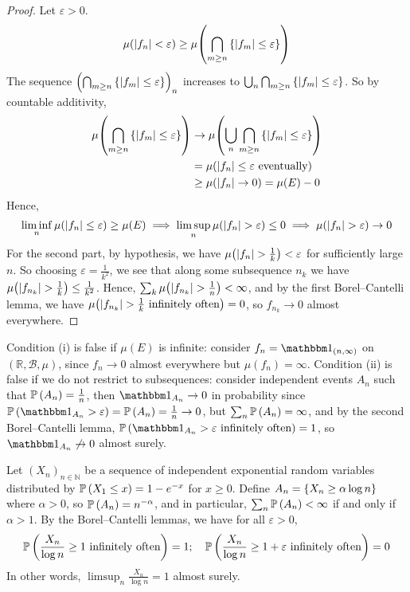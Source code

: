 \begin{proof}
	Let \( \varepsilon > 0 \).
	\[ \mu(\abs{f_n} < \varepsilon) \geq \mu\qty(\bigcap_{m \geq n} \qty{\abs{f_m} \leq \varepsilon}) \]
	The sequence \( \qty(\bigcap_{m \geq n} \qty{\abs{f_m} \leq \varepsilon})_n \) increases to \( \bigcup_n \bigcap_{m \geq n} \qty{\abs{f_m} \leq \varepsilon} \).
	So by countable additivity,
	\begin{align*}
		\mu\qty(\bigcap_{m \geq n} \qty{\abs{f_m} \leq \varepsilon}) &\to \mu\qty(\bigcup_n \bigcap_{m \geq n} \qty{\abs{f_m} \leq \varepsilon}) \\
		&= \mu\qty(\abs{f_n} \leq \varepsilon \text{ eventually}) \\
		&\geq \mu(\abs{f_n} \to 0) = \mu(E) - 0
	\end{align*}
	Hence,
	\[ \liminf_n \mu(\abs{f_n} \leq \varepsilon) \geq \mu(E) \implies \limsup_n \mu(\abs{f_n} > \varepsilon) \leq 0 \implies \mu(\abs{f_n} > \varepsilon) \to 0 \]
	For the second part, by hypothesis, we have \( \mu\qty(\abs{f_n} > \frac{1}{k}) < \varepsilon \) for sufficiently large \( n \).
	So choosing \( \varepsilon = \frac{1}{k^2} \), we see that along some subsequence \( n_k \) we have \( \mu\qty(\abs{f_{n_k}} > \frac{1}{k}) \leq \frac{1}{k^2} \).
	Hence, \( \sum_k \mu\qty(\abs{f_{n_k}} > \frac{1}{n}) < \infty \), and by the first Borel--Cantelli lemma, we have \( \mu\qty(\abs{f_{n_k}} > \frac{1}{k} \text{ infinitely often}) = 0 \), so \( f_{n_k} \to 0 \) almost everywhere.
\end{proof}
\begin{remark}
	Condition (i) is false if \( \mu(E) \) is infinite: consider \( f_n = \mathbbm 1_{(n,\infty)} \) on \( (\mathbb R,\mathcal B,\mu) \), since \( f_n \to 0 \) almost everywhere but \( \mu(f_n) = \infty \).
	Condition (ii) is false if we do not restrict to subsequences: consider independent events \( A_n \) such that \( \mathbb{P}\left({A_n}\right) = \frac{1}{n} \), then \( \mathbbm 1_{A_n} \to 0 \) in probability since \( \prob{\mathbbm 1_{A_n} > \varepsilon} = \prob{A_n} = \frac{1}{n} \to 0 \), but \( \sum_n \mathbb{P}\left({A_n}\right) = \infty \), and by the second Borel--Cantelli lemma, \( \prob{\mathbbm 1_{A_n} > \varepsilon \text{ infinitely often}} = 1 \), so \( \mathbbm 1_{A_n} \not\to 0 \) almost surely.
\end{remark}
\begin{example}
	Let \( (X_n)_{n \in \mathbb N} \) be a sequence of independent exponential random variables distributed by \( \mathbb{P}\left({X_1 \leq x}\right) = 1 - e^{-x} \) for \( x \geq 0 \).
	Define \( A_n = \qty{X_n \geq \alpha \log n} \) where \( \alpha > 0 \), so \( \mathbb{P}\left({A_n}\right) = n^{-\alpha} \), and in particular, \( \sum_n \mathbb{P}\left({A_n}\right) < \infty \) if and only if \( \alpha > 1 \).
	By the Borel--Cantelli lemmas, we have for all \( \varepsilon > 0 \),
	\[ \mathbb{P}\left({\frac{X_n}{\log n} \geq 1 \text{ infinitely often}}\right) = 1;\quad \mathbb{P}\left({\frac{X_n}{\log n} \geq 1 + \varepsilon \text{ infinitely often}}\right) = 0 \]
	In other words, \( \limsup_n \frac{X_n}{\log n} = 1 \) almost surely.
\end{example}

